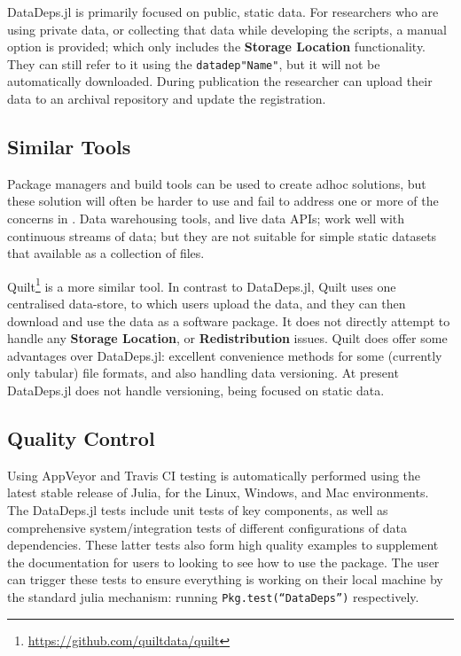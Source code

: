 \documentclass[dvinames]{jors}
\newcommand{\datadep}[1]{\texttt{datadep"{}#1"{}}}
\begin{document}
\noindent DataDeps.jl is primarily focused on public, static data.
For researchers who are using private data, or collecting that data while developing the scripts, a manual option is provided; which only includes the \textbf{Storage Location} functionality. They can still refer to it using the \datadep{Name}, but it will not be automatically downloaded.
During publication the researcher can upload their data to an archival repository and update the registration.



\subsection{Similar Tools}
Package managers and build tools can be used to create adhoc solutions, but these solution will often be harder to use and fail to address one or more of the concerns in .
Data warehousing tools, and live data APIs; work well with continuous streams of data;
but they are not suitable for simple static datasets that available as a collection of files.


Quilt\footnote{\url{https://github.com/quiltdata/quilt}} is a more similar tool.
In contrast to DataDeps.jl, Quilt uses one centralised data-store, to which users upload the data, and they can then download and use the data as a software package.
It does not directly attempt to handle any \textbf{Storage Location}, or \textbf{Redistribution} issues.
%
Quilt does offer some advantages over DataDeps.jl:
excellent convenience methods for some (currently only tabular) file formats, 
and also handling data versioning.
At present DataDeps.jl does not handle versioning, being focused on static data.


\subsection{Quality Control}

Using AppVeyor and Travis CI testing is automatically performed using the latest stable release of Julia, for the Linux, Windows, and Mac environments.
The DataDeps.jl tests include unit tests of key components, as well as comprehensive system/integration tests of different configurations of data dependencies.
These latter tests also form high quality examples to supplement the documentation for users to looking to see how to use the package.
The user can trigger these tests to ensure everything is working on their local machine by the standard julia mechanism: running \texttt{Pkg.test(``DataDeps'')} respectively.
\end{document}

